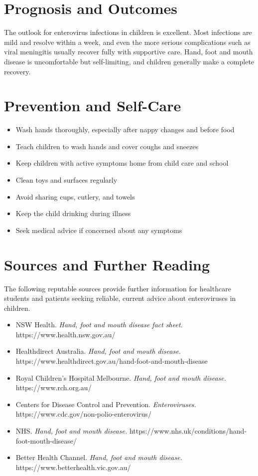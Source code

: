 \section*{Prognosis and Outcomes}
The outlook for enterovirus infections in children is excellent. Most infections are mild and resolve within a week, and even the more serious complications such as viral meningitis usually recover fully with supportive care. Hand, foot and mouth disease is uncomfortable but self-limiting, and children generally make a complete recovery.

\section*{Prevention and Self-Care}
\begin{itemize}
    \item Wash hands thoroughly, especially after nappy changes and before food
    \item Teach children to wash hands and cover coughs and sneezes
    \item Keep children with active symptoms home from child care and school
    \item Clean toys and surfaces regularly
    \item Avoid sharing cups, cutlery, and towels
    \item Keep the child drinking during illness
    \item Seek medical advice if concerned about any symptoms
\end{itemize}

\section*{Sources and Further Reading}
The following reputable sources provide further information for healthcare students and patients seeking reliable, current advice about enteroviruses in children.
\begin{itemize}
    \item NSW Health. \textit{Hand, foot and mouth disease fact sheet.} https://www.health.nsw.gov.au/
    \item Healthdirect Australia. \textit{Hand, foot and mouth disease.} https://www.healthdirect.gov.au/hand-foot-and-mouth-disease
    \item Royal Children's Hospital Melbourne. \textit{Hand, foot and mouth disease.} https://www.rch.org.au/
    \item Centers for Disease Control and Prevention. \textit{Enteroviruses.} https://www.cdc.gov/non-polio-enterovirus/
    \item NHS. \textit{Hand, foot and mouth disease.} https://www.nhs.uk/conditions/hand-foot-mouth-disease/
    \item Better Health Channel. \textit{Hand, foot and mouth disease.} https://www.betterhealth.vic.gov.au/
\end{itemize}
